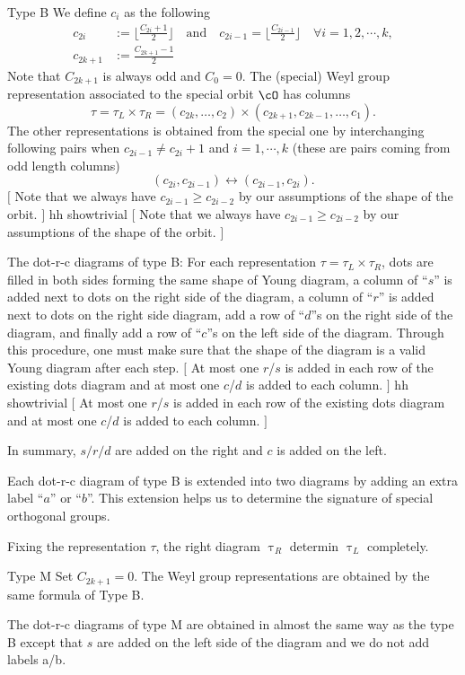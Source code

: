 \documentclass[12pt,a4paper]{amsart}
\newcommand{\trivial}[2][]{\if\relax\detokenize{#1}\relax
  {%
      \color{orange} \vspace{0em} $[$  #2 $]$
      \color{black}
  }
  \else
\ifx#1h
\ifcsname showtrivial\endcsname
{%
    \color{orange} \vspace{0em}  $[$ #2 $]$
    \color{black}
}
\fi
\else {\red Wrong argument!} \fi
\fi
}
\numberwithin{equation}{section}
\theoremstyle{remark}
\def\floor#1{{\lfloor #1 \rfloor}}
\begin{document}
\begin{des}
  \item[Type B] We define $c_{i}$ as the following
  \[
    \begin{split}
      c_{2i} & := \floor{\frac{C_{2i}+1}{2}} \quad \text{and}\quad c_{2i-1} =\floor{\frac{C_{2i-1}}{2}}
      \quad \forall i=1,2, \cdots, k,\\
      c_{2k+1} & := \frac{C_{2k+1}-1}{2}
    \end{split}
  \]
  Note that $C_{2k+1}$ is always odd and $C_{0}=0$.
  The (special)
  Weyl group representation associated to the special orbit $\cO$ has columns
  \[
    \tau = \tau_L\times\tau_R= (c_{2k},\dots ,c_2) \times (c_{2k+1},c_{2k-1},\dots , c_1).
  \]
  The other representations is obtained from the special one by interchanging
  following pairs when $c_{2i-1}\neq c_{2i}+1$ and $i=1, \cdots, k$ (these are
  pairs coming from odd length columns)
  \[
    (c_{2i}, c_{2i-1})\longleftrightarrow (c_{2i-1}, c_{2i}).
  \]
  \trivial[h]{ Note that we always have $c_{2i-1} \geq c_{2i-2}$ by our
    assumptions of the shape of the orbit. }

  The dot-r-c diagrams of type B: For each representation
  $\tau = \tau_L\times \tau_R$, dots are filled in both sides forming the same
  shape of Young diagram, a column of ``$s$'' is added next to dots on the right
  side of the diagram, a column of ``$r$'' is added next to dots on the right
  side diagram, add a row of ``$d$''s on the right side of the diagram, and
  finally add a row of ``$c$''s on the left side of the diagram. Through this
  procedure, one must make sure that the shape of the diagram is a valid Young
  diagram after each step. \trivial[h]{At most one $r$/$s$ is added in each row
    of the existing dots diagram and at most one $c$/$d$ is added to each
    column.}

  In summary, $s/r/d$ are added on the right and $c$ is added on the left.

  Each dot-r-c diagram of type B is extended into two diagrams by adding an
  extra label ``$a$'' or ``$b$''. This extension helps us to determine the
  signature of special orthogonal groups.


  Fixing the representation $\tau$, the right diagram $\uptau_{R}$ determin
  $\uptau_{L}$ completely.

  \item[Type M] Set $C_{2k+1}=0$. The Weyl group representations are obtained by
  the same formula of Type B.

  The dot-r-c diagrams of type M are obtained in almost the same way as the type
  B except that $s$ are added on the left side of the diagram and we do not add
  labels a/b.
\end{des}
\end{document}
